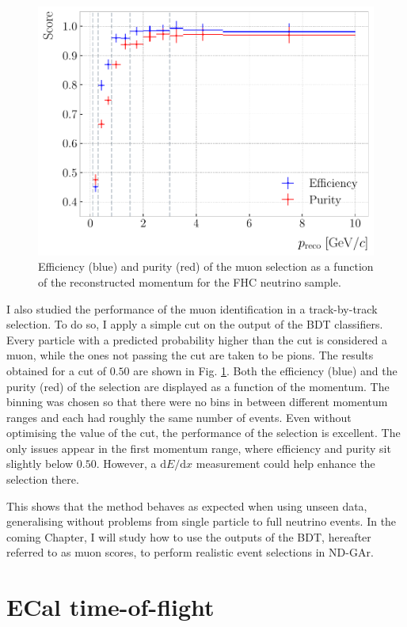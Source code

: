 \begin{figure}[t]
	\centering
	\includegraphics[width=.75\linewidth]{Images/GArSoft_PID/BDT/ecal_bdt_validation_momentum.pdf}
	\caption[Efficiency and purity of the muon selection as a function of the reconstructed momentum for the FHC neutrino sample.]{Efficiency (blue) and purity (red) of the muon selection as a function of the reconstructed momentum for the FHC neutrino sample.}
	\label{fig:bdt_validation_output}
\end{figure}

I also studied the performance of the muon identification in a track-by-track selection. To do so, I apply a simple cut on the output of the BDT classifiers. Every particle with a predicted probability higher than the cut is considered a muon, while the ones not passing the cut are taken to be pions. The results obtained for a cut of $0.50$ are shown in Fig. \ref{fig:bdt_validation_output}. Both the efficiency (blue) and the purity (red) of the selection are displayed as a function of the momentum. The binning was chosen so that there were no bins in between different momentum ranges and each had roughly the same number of events. Even without optimising the value of the cut, the performance of the selection is excellent. The only issues appear in the first momentum range, where efficiency and purity sit slightly below $0.50$. However, a $\mathrm{d}E/\mathrm{d}x$ measurement could help enhance the selection there.

This shows that the method behaves as expected when using unseen data, generalising without problems from single particle to full neutrino events. In the coming Chapter, I will study how to use the outputs of the BDT, hereafter referred to as muon scores, to perform realistic event selections in ND-GAr.

\section{ECal time-of-flight}\label{section:tof}

